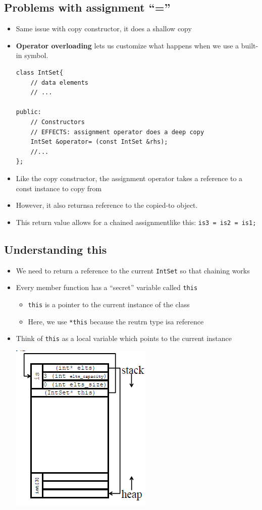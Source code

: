 \subsection{Problems with assignment ``=''}
\begin{itemize}
	\item Same issue with copy constructor, it does a shallow copy
	\item \textbf{Operator overloading} lets us customize what happens when we use a built-in symbol.
\begin{lstlisting}[style=C++]
class IntSet{
	// data elements
	// ...

public:
	// Constructors
	// EFFECTS: assignment operator does a deep copy
	IntSet &operator= (const IntSet &rhs);
	//...
};
\end{lstlisting}
	\item Like the copy constructor, the assignment operator takes a reference to a const instance to copy from
	\item However, it also returnsa reference to the copied-to object.
	\item This return value allows for a chained assignmentlike this: \lstinline[style=C++]{is3 = is2 = is1; }
\end{itemize}

\subsection{Understanding this}
\begin{itemize}
	\item We need to return a reference to the current \lstinline[style=C++]{IntSet} so that chaining works
	\item Every member function has a ``secret'' variable called \lstinline[style=C++]{this}
	\begin{itemize}
		\item \lstinline[style=C++]{this} is a pointer to the current instance of the class
		\item Here, we use \lstinline[style=C++]{*this} because the reutrn type isa reference
	\end{itemize}
	\item Think of \lstinline[style=C++]{this} as a local variable which points to the current instance
	\begin{center}
		\includegraphics{sections/lec17/this.png}
	\end{center}
\end{itemize}

